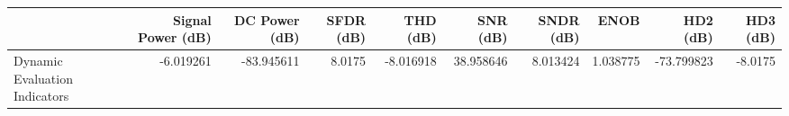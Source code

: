 \begin{tabular}{lrrrrrrrrr}
\toprule
{} &  Signal Power (dB) &  DC Power (dB) &  SFDR (dB) &  THD (dB) &   SNR (dB) &  SNDR (dB) &      ENOB &   HD2 (dB) &  HD3 (dB) \\
\midrule
Dynamic Evaluation Indicators &          -6.019261 &     -83.945611 &     8.0175 & -8.016918 &  38.958646 &   8.013424 &  1.038775 & -73.799823 &   -8.0175 \\
\bottomrule
\end{tabular}
